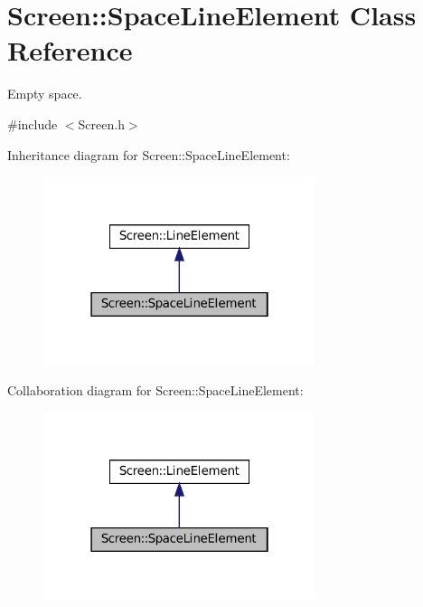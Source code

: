 \hypertarget{classScreen_1_1SpaceLineElement}{}\section{Screen\+:\+:Space\+Line\+Element Class Reference}
\label{classScreen_1_1SpaceLineElement}


Empty space.  




{\ttfamily \#include $<$Screen.\+h$>$}



Inheritance diagram for Screen\+:\+:Space\+Line\+Element\+:
\nopagebreak
\begin{figure}[H]
\begin{center}
\leavevmode
\includegraphics[width=226pt]{classScreen_1_1SpaceLineElement__inherit__graph}
\end{center}
\end{figure}


Collaboration diagram for Screen\+:\+:Space\+Line\+Element\+:
\nopagebreak
\begin{figure}[H]
\begin{center}
\leavevmode
\includegraphics[width=226pt]{classScreen_1_1SpaceLineElement__coll__graph}
\end{center}
\end{figure}
